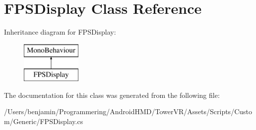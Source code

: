 \hypertarget{class_f_p_s_display}{}\section{F\+P\+S\+Display Class Reference}
\label{class_f_p_s_display}
Inheritance diagram for F\+P\+S\+Display\+:\begin{figure}[H]
\begin{center}
\leavevmode
\includegraphics[height=2.000000cm]{class_f_p_s_display}
\end{center}
\end{figure}


The documentation for this class was generated from the following file\+:\begin{DoxyCompactItemize}
\item 
/\+Users/benjamin/\+Programmering/\+Android\+H\+M\+D/\+Tower\+V\+R/\+Assets/\+Scripts/\+Custom/\+Generic/F\+P\+S\+Display.\+cs\end{DoxyCompactItemize}
